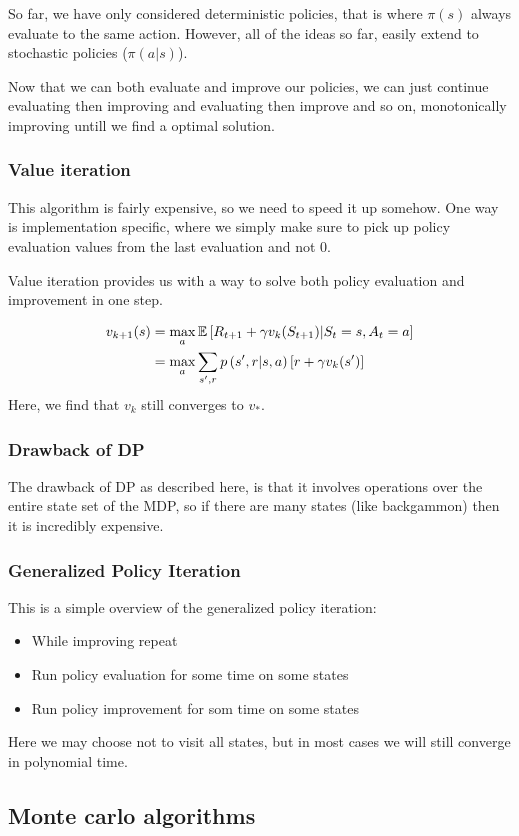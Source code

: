     So far, we have only considered deterministic policies, that is where 
    $\pi(s)$ always evaluate to the same action. However, all of the ideas so 
    far, easily extend to stochastic policies ($\pi(a|s)$).

    Now that we can both evaluate and improve our policies, we can just 
    continue evaluating then improving and evaluating then improve and so on, 
    monotonically improving untill we find a optimal solution.
    
    \subsubsection{Value iteration}
    This algorithm is fairly expensive, so we need to speed it up somehow. One 
    way is implementation specific, where we simply make sure to pick up policy 
    evaluation values from the last evaluation and not $0$.
    
    Value iteration provides us with a way to solve both policy evaluation and 
    improvement in one step.
    
    \begin{align*}
    v_{k+1}(s)&=\max_a\mathbb{E}\left[R_{t+1}+\gamma v_k(S_{t+1}) \middle\vert 
    S_t=s, A_t=a \right]\\
        &= \max_a \sum_{s',r}p\left(s',r \middle\vert s,a \right)\left[r+\gamma 
        v_k(s')\right]
    \end{align*}
    Here, we find that $v_k$ still converges to $v_*$.
    
    \subsubsection{Drawback of DP}
    The drawback of DP as described here, is that it involves operations over 
    the entire state set of the MDP, so if there are many states (like 
    backgammon) then it is incredibly expensive.
    
    \subsubsection{Generalized Policy Iteration}
    This is a simple overview of the generalized policy iteration:
    \begin{itemize}
        \item While improving repeat
        \item Run policy evaluation for some time on some states
        \item Run policy improvement for som time on some states
    \end{itemize}
    Here we may choose not to visit all states, but in most cases we will still 
    converge in polynomial time.
    
    \subsection{Monte carlo algorithms}
    
